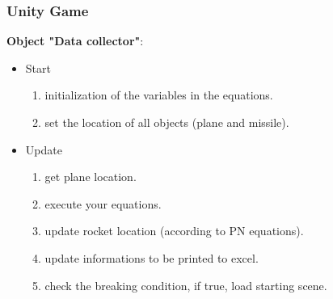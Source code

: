 \documentclass{beamer}
\begin{document}
\begin{frame}
\frametitle{Unity Game}
\textbf{Object "Data collector"}:
\begin{itemize}
\item Start
\begin{enumerate}
	\item initialization of the variables in the equations.
	\item set the location of all objects (plane and missile).
\end{enumerate}
\item Update 
\begin{enumerate}
	\item get plane location.
	\item execute your equations.
	\item update rocket location (according to PN equations).
	\item update informations to be printed to excel.
	\item check the breaking condition, if true, load starting scene.
\end{enumerate}
\end{itemize}
\end{frame}
\end{document}
